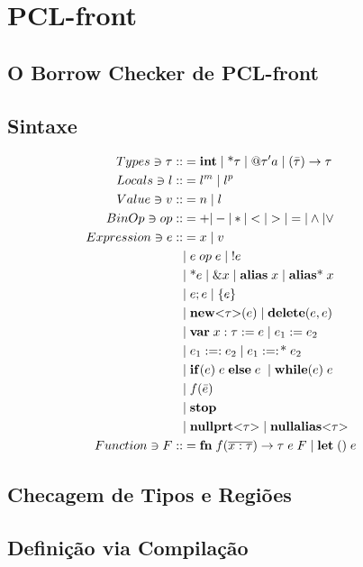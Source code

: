 \chapter{PCL-front}

\section{O Borrow Checker de PCL-front}

\section{Sintaxe}

\begingroup
\setlength{\jot}{-0.2ex} 
	\begin{align*}
		Types \ni \tau ::&= \mathbf{int} \;|\; \text{*}\tau \;|\; @\tau'a \;|\; (\bar\tau) \to \tau \\
		Locals \ni l ::&= l^m \;|\; l^p &&\\ 
		Value \ni v ::&= n \;|\; l && \\
		BinOp \ni op ::&= + | - | * | < | > | = | \land | \lor \\
		Expression \ni e ::&= x \;|\; v \\
		&|\; e\; op\; e \;|\; !e  \\
		&|\; \text{*}e \;|\; \&x \;|\; \mathbf{alias} \; x \;|\; \mathbf{alias}\text{*} \; x\\
		&|\; e;e \;|\; \{e\} \\ 
		&|\; \mathbf{new}\text{<}\tau\text{>}(e) \;|\; \mathbf{delete}(e, e) \; \\ 
		&|\; \mathbf{var}\; x: \tau := e \;|\; e_1 := e_2 \\
		&|\; e_1 :=: e_2 \;|\; e_1 :=:\!\text{*}\;e_2\\
		&|\; \mathbf{if}(e) \; e \; \mathbf{else} \; e \; \;|\; \mathbf{while}(e) \; e \\
		&|\; f(\bar e) \\ 
		&|\; \mathbf{stop}\\ 
		&|\; \mathbf{nullprt}\text{<}\tau\text{>} \;|\; \mathbf{nullalias}\text{<}\tau\text{>}\\ 
		Function \ni F ::&= \mathbf{fn} \; f(\overline{x : \tau}) \to \tau \; e \; F \; | \; \mathbf{let}\;() \; e \\
	\end{align*}
\endgroup

\section{Checagem de Tipos e Regiões}

\section{Definição via Compilação}